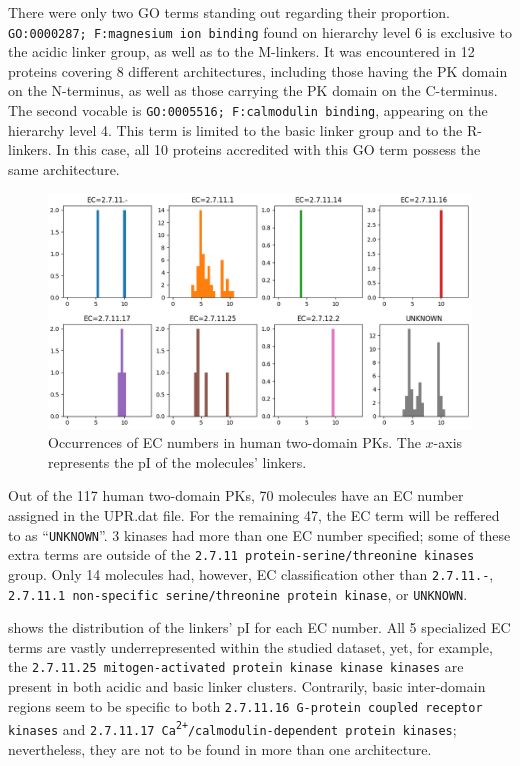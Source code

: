 		There were only two GO terms standing out regarding their proportion.
		\texttt{GO:0000287; F:magnesium ion binding} found on hierarchy level 6 is exclusive
		to the acidic linker group, as well as to the M-linkers.
		It was encountered in 12 proteins covering 8 different architectures, including those
		having the PK domain on the N-terminus, as well as those carrying the PK domain on the
		C-terminus.
		The second vocable is \texttt{GO:0005516; F:calmodulin binding}, appearing on the
		hierarchy level 4.
		This term is limited to the basic linker group and to the R-linkers.
		In this case, all 10 proteins accredited with this GO term possess the same
		architecture.

	\label{res:first:ec}

		\begin{figure}
			\centering
			\includegraphics[width=\linewidth]{img/iso_density_ec.png}
			\caption{Occurrences of EC numbers in human two-domain PKs.
			The $x$-axis represents the pI of the molecules' linkers.}
			\label{fig:ec}
		\end{figure}

		Out of the 117 human two-domain PKs, 70 molecules have an EC number assigned in the
		UPR.dat file.
		For the remaining 47, the EC term will be reffered to as ``\texttt{UNKNOWN}''.
		3 kinases had more than one EC number specified; some of these extra terms are
		outside of the \texttt{2.7.11 protein-serine/threonine kinases} group.
		Only 14 molecules had, however, EC classification other than \texttt{2.7.11.-},
		\texttt{2.7.11.1 non-specific serine/threonine protein kinase}, or \texttt{UNKNOWN}.

		 shows the distribution of the linkers' pI for each EC number.
		All 5 specialized EC terms are vastly underrepresented within the studied dataset,
		yet, for example, the \texttt{2.7.11.25 mitogen-activated protein kinase kinase
		kinases} are present in both acidic and basic linker clusters.
		Contrarily, basic inter-domain regions seem to be specific to both \texttt{2.7.11.16
		G-protein coupled receptor kinases} and
		\texttt{2.7.11.17 Ca\textsuperscript{2+}/calmodulin-dependent protein kinases};
		nevertheless, they are not to be found in more than one architecture.

